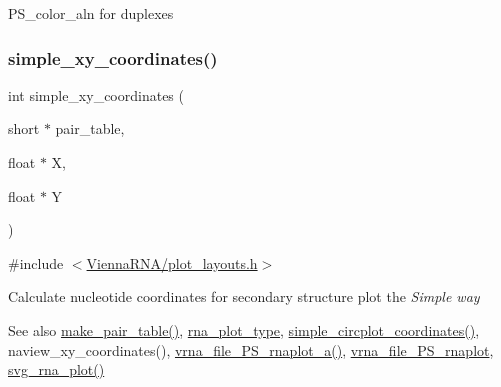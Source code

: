 P\+S\+\_\+color\+\_\+aln for duplexes \mbox{\label{group__plotting__utils_gaf4b9173e7d3fd361c3c85e6def194123}} 
\subsubsection{\texorpdfstring{simple\+\_\+xy\+\_\+coordinates()}{simple\_xy\_coordinates()}}
{\footnotesize\ttfamily int simple\+\_\+xy\+\_\+coordinates (\begin{DoxyParamCaption}\item[{short $\ast$}]{pair\+\_\+table,  }\item[{float $\ast$}]{X,  }\item[{float $\ast$}]{Y }\end{DoxyParamCaption})}



{\ttfamily \#include $<$\hyperlink{plot__layouts_8h}{Vienna\+R\+N\+A/plot\+\_\+layouts.\+h}$>$}



Calculate nucleotide coordinates for secondary structure plot the {\itshape Simple way} 

\begin{DoxySeeAlso}{See also}
\hyperlink{group__struct__utils_ga89c32307ee50a0026f4a3131fac0845a}{make\+\_\+pair\+\_\+table()}, \hyperlink{group__plotting__utils_ga5964c4581431b098b80027d6e14dcdd4}{rna\+\_\+plot\+\_\+type}, \hyperlink{group__plotting__utils_gac4ea13d35308f09940178d2b05a248c2}{simple\+\_\+circplot\+\_\+coordinates()}, naview\+\_\+xy\+\_\+coordinates(), \hyperlink{plot__structure_8h_a139a31dd0ba9fc6612431f67de901c31}{vrna\+\_\+file\+\_\+\+P\+S\+\_\+rnaplot\+\_\+a()}, \hyperlink{plot__structure_8h_abdc8f6548ba4a3bc3cd868ccbcfdb86a}{vrna\+\_\+file\+\_\+\+P\+S\+\_\+rnaplot}, \hyperlink{plot__structure_8h_ae7853539b5df98f294b4af434e979304}{svg\+\_\+rna\+\_\+plot()}
\end{DoxySeeAlso}

